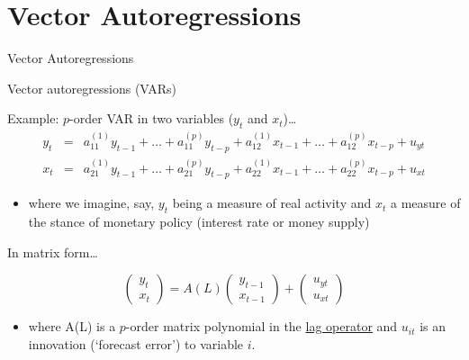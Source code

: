 \section{Vector Autoregressions}

\begin{frame}

\begin{center}
{\LARGE Vector Autoregressions}
\end{center}

\end{frame}


\begin{frame}{Vector autoregressions (VARs)}

Example: $p$-order VAR in two variables ($y_{t}$ and $x_{t}$)\ldots
\begin{eqnarray*}
y_{t} 	&=& a^{(1)}_{11}y_{t-1}+\ldots +a^{(p)}_{11}y_{t-p}+a^{(1)}_{12}x _{t-1}+\ldots+a^{(p)}_{12}x _{t-p}+u_{yt} \\
x _{t} 	&=&	a_{21}^{(1)}y_{t-1}+\ldots +a^{(p)}_{21}y_{t-p}+a^{(1)}_{22}x_{t-1}+\ldots +a^{(p)}_{22}x _{t-p}+u_{xt}
\end{eqnarray*}
\begin{itemize}
\item[]	where we imagine, say, $y_{t}$ being a measure of real activity and $x_{t}$ a measure of the stance of monetary policy (interest rate or money supply)
\end{itemize}
\vspace{1.5mm}
In matrix form\ldots
\begin{small}
\begin{equation*}
\begin{pmatrix}
y_{t} \\
x_{t}
\end{pmatrix}
= A(L)
\begin{pmatrix}
y_{t-1} \\
x_{t-1}
\end{pmatrix}
+
\begin{pmatrix}
u_{yt} \\
u_{xt}
\end{pmatrix}
\end{equation*}
\end{small}
\begin{itemize}
\item[]	where A(L) is a $p$-order matrix polynomial in the \href{https://en.wikipedia.org/wiki/Lag_operator}{lag operator} and $u_{it}$ is an innovation (`forecast error') to variable $i$.
\end{itemize}

\end{frame}

